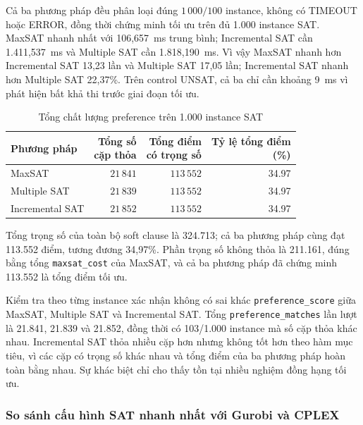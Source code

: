 \documentclass[a4paper,fleqn]{cas-sc}
\begin{document}
Cả ba phương pháp đều phân loại đúng $1\,000/100$ instance, không có TIMEOUT hoặc ERROR, đồng thời chứng minh tối ưu trên đủ 1.000 instance SAT. MaxSAT nhanh nhất với 106,657~ms trung bình; Incremental SAT cần 1.411,537~ms và Multiple SAT cần 1.818,190~ms. Vì vậy MaxSAT nhanh hơn Incremental SAT 13,23 lần và Multiple SAT 17,05 lần; Incremental SAT nhanh hơn Multiple SAT 22,37\%. Trên control UNSAT, cả ba chỉ cần khoảng 9~ms vì phát hiện bất khả thi trước giai đoạn tối ưu. 
\begin{table}[htbp]
\centering
\caption{Tổng chất lượng preference trên 1.000 instance SAT}
\label{tab:preference-results}
\small
\begin{tabular}{@{}lrrr@{}}
\toprule
Phương pháp & \shortstack{Tổng số\\cặp thỏa} & \shortstack{Tổng điểm\\có trọng số} & \shortstack{Tỷ lệ tổng điểm\\(\%)}\\
\midrule
MaxSAT          & $21\,841$ & $113\,552$ & 34.97\\
Multiple SAT    & $21\,839$ & $113\,552$ & 34.97\\
Incremental SAT & $21\,852$ & $113\,552$ & 34.97\\
\bottomrule
\end{tabular}
\end{table}

Tổng trọng số  của toàn bộ soft clause là 324.713; cả ba phương pháp cùng đạt 113.552 điểm, tương đương 34,97\%. Phần trọng số không thỏa là 211.161, đúng bằng tổng \texttt{maxsat\_cost} của MaxSAT, và cả ba phương pháp đã chứng minh 113.552 là tổng điểm tối ưu.

Kiểm tra theo từng instance xác nhận không có sai khác \texttt{preference\_score} giữa MaxSAT, Multiple SAT và Incremental SAT. Tổng \texttt{preference\_matches} lần lượt là 21.841, 21.839 và 21.852, đồng thời có 103/1.000 instance mà số cặp thỏa khác nhau. Incremental SAT thỏa nhiều cặp hơn  nhưng không tốt hơn theo hàm mục tiêu, vì các cặp có trọng số khác nhau và tổng điểm của ba phương pháp hoàn toàn bằng nhau. Sự khác biệt chỉ cho thấy tồn tại nhiều nghiệm đồng hạng tối ưu.

\subsubsection{So sánh cấu hình SAT nhanh nhất với Gurobi và CPLEX}
\end{document}

